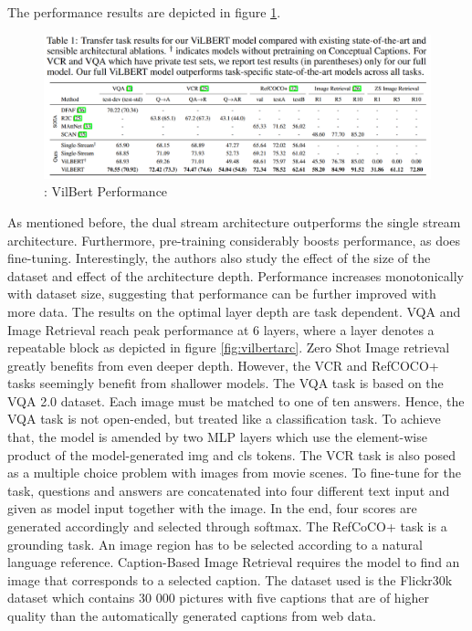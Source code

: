 \documentclass[
]{krantz}
\begin{document}
The performance results are depicted in figure \ref{fig:vilbertresults}.

\begin{figure}

{\centering \includegraphics[width=1\linewidth]{figures/05-chapter2/vilbertresults} 

}

\caption{\citet{lu2019vilbert}: VilBert Performance}\label{fig:vilbertresults}
\end{figure}



As mentioned before, the dual stream architecture outperforms the single stream architecture. Furthermore, pre-training considerably boosts performance, as does fine-tuning. Interestingly, the authors also study the effect of the size of the dataset and effect of the architecture depth. Performance increases monotonically with dataset size, suggesting that performance can be further improved with more data. The results on the optimal layer depth are task dependent. VQA and Image Retrieval reach peak performance at 6 layers, where a layer denotes a repeatable block as depicted in figure \ref{fig:vilbertarc}. Zero Shot Image retrieval greatly benefits from even deeper depth. However, the VCR and RefCOCO+ tasks seemingly benefit from shallower models. The VQA task is based on the VQA 2.0 dataset. Each image must be matched to one of ten answers. Hence, the VQA task is not open-ended, but treated like a classification task. To achieve that, the model is amended by two MLP layers which use the element-wise product of the model-generated img and cls tokens. The VCR task is also posed as a multiple choice problem with images from movie scenes. To fine-tune for the task, questions and answers are concatenated into four different text input and given as model input together with the image. In the end, four scores are generated accordingly and selected through softmax. The RefCoCO+ task is a grounding task. An image region has to be selected according to a natural language reference. Caption-Based Image Retrieval requires the model to find an image that corresponds to a selected caption. The dataset used is the Flickr30k dataset which contains 30 000 pictures with five captions that are of higher quality than the automatically generated captions from web data.
\end{document}
